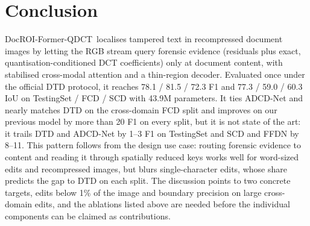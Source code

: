 \documentclass[11pt,a4paper]{article}
\newcommand{\ours}{DocROI-Former-QDCT}
\begin{document}
\section{Conclusion}\label{sec:conclusion}
\ours\ localises tampered text in recompressed document images by letting the RGB stream query
forensic evidence (residuals plus exact, quantisation-conditioned DCT coefficients) only at
document content, with stabilised cross-modal attention and a thin-region decoder. Evaluated once
under the official DTD protocol, it reaches 78.1 / 81.5 / 72.3 F1 and 77.3 / 59.0 / 60.3 IoU on
TestingSet / FCD / SCD with 43.9M parameters. It ties ADCD-Net and nearly matches DTD on the
cross-domain FCD split and improves on our previous model by more than 20 F1 on every split, but
it is not state of the art: it trails DTD and ADCD-Net by 1--3 F1 on TestingSet and SCD and FFDN by
8--11. This pattern follows from the design use case: routing forensic evidence to content and
reading it through spatially reduced keys works well for word-sized edits and recompressed
images, but blurs single-character edits, whose share predicts the gap to DTD on each split. The
discussion points to two concrete targets, edits below 1\% of the image and boundary precision on
large cross-domain edits, and the ablations listed above are needed before the individual
components can be claimed as contributions.
\end{document}
